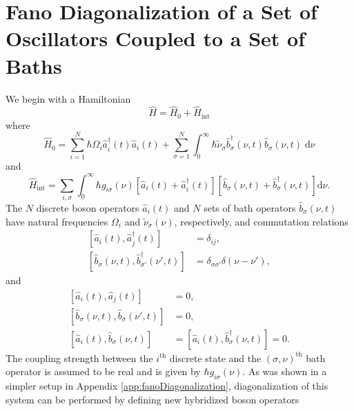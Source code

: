 
\section{Fano Diagonalization of a Set of Oscillators Coupled to a Set of Baths}\label{app:fanoDiagonalizationManyModes}

We begin with a Hamiltonian
\begin{equation}\label{eq:HmanyModes}
\hat{H} = \hat{H}_0 + \hat{H}_\mathrm{int}
\end{equation}
where 
\begin{equation}
\hat{H}_0 = \sum_{i = 1}^{N}\hbar\Omega_i\hat{a}_{i}^\dagger(t)\hat{a}_{i}(t) + \sum_{\sigma = 1}^N\int_0^\infty\hbar\tilde{\nu}_\sigma\hat{b}_\sigma^\dagger(\nu,t)\hat{b}_\sigma(\nu,t)\;\mathrm{d}\nu
\end{equation}
and
\begin{equation}
\hat{H}_\mathrm{int} = \sum_{i,\sigma}\int_0^\infty\hbar g_{i \sigma}(\nu)\left[\hat{a}_{i}(t) + \hat{a}_{i}^\dagger(t)\right]\left[\hat{b}_\sigma(\nu,t) + \hat{b}_\sigma^\dagger(\nu,t)\right]\mathrm{d}\nu.
\end{equation}
The $N$ discrete boson operators $\hat{a}_i(t)$ and $N$ sets of bath operators $\hat{b}_\sigma(\nu,t)$ have natural frequencies $\Omega_i$ and $\tilde{\nu}_\sigma(\nu)$, respectively, and commutation relations
\begin{equation}
\begin{split}
\left[\hat{a}_i(t),\hat{a}_{j}^\dagger(t)\right] &= \delta_{ij},\\
\left[\hat{b}_\sigma(\nu,t),\hat{b}_{\sigma'}^\dagger(\nu',t)\right] &= \delta_{\sigma\sigma'}\delta(\nu - \nu'),
\end{split}
\end{equation}
and
\begin{equation}
\begin{split}
\left[\hat{a}_i(t),\hat{a}_{j}(t)\right] &= 0,\\
\left[\hat{b}_\sigma(\nu,t),\hat{b}_\sigma(\nu',t)\right] &= 0,\\
\left[\hat{a}_i(t),\hat{b}_\sigma(\nu,t)\right] &= \left[\hat{a}_i(t),\hat{b}_\sigma^\dagger(\nu,t)\right] = 0.
\end{split}
\end{equation}
The coupling strength between the $i^\mathrm{th}$ discrete state and the $(\sigma,\nu)^\mathrm{th}$ bath operator is assumed to be real and is given by $\hbar g_{i\sigma}(\nu)$. As was shown in a simpler setup in Appendix \ref{app:fanoDiagonalization}, diagonalization of this system can be performed by defining new hybridized boson operators
